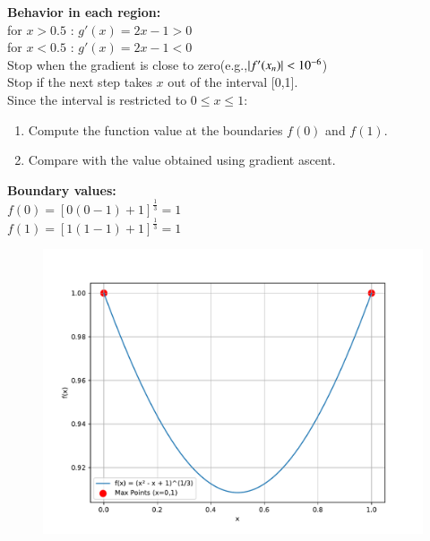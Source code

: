 \documentclass[journal]{IEEEtran}
\begin{document}
\textbf{Behavior in each region:}\\
for $x>0.5$ : $g'(x) = 2x - 1>0$\\
for $x<0.5$ : $g'(x) = 2x - 1<0$\\
Stop when the gradient is close to zero(e.g.,$\left\vert f'(x_n)\right\vert< 10^{-6}$)\\
Stop if the next step takes $x$ out of the interval [0,1].\\
Since the interval is restricted to $0\leq x \leq 1$:\\
\begin{enumerate}
    \item Compute the function value at the boundaries $f(0)$ and $f(1)$.
    \item Compare with the value obtained using gradient ascent.
\end{enumerate}
\textbf{Boundary values:}\\
$f(0) = [0(0-1)+1]^{\frac{1}{3}} = 1$\\
$f(1) = [1(1-1)+1]^{\frac{1}{3}} = 1$
\begin{figure}[h!]
   \centering
   \includegraphics[width=\columnwidth]{figs/fig.pdf}
\end{figure}
\end{document}
